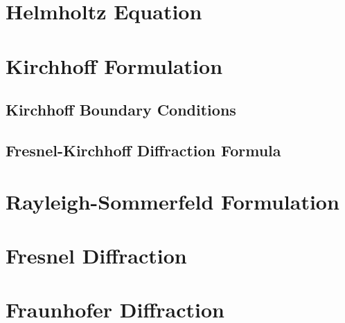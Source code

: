 \documentclass[../electromagnetism.tex]{subfiles}
\begin{document}
\section{Helmholtz Equation}
\section{Kirchhoff Formulation}
\subsection{Kirchhoff Boundary Conditions}
\subsection{Fresnel-Kirchhoff Diffraction Formula}
\section{Rayleigh-Sommerfeld Formulation}
\section{Fresnel Diffraction}
\section{Fraunhofer Diffraction}
\end{document}
